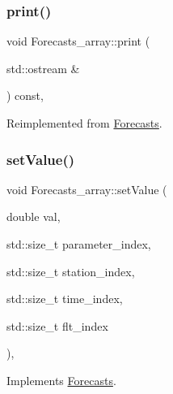 \mbox{\label{class_forecasts__array_a56985347f516340034b29dc4cdda87b1}} 
\subsubsection{\texorpdfstring{print()}{print()}}
{\footnotesize\ttfamily void Forecasts\+\_\+array\+::print (\begin{DoxyParamCaption}\item[{std\+::ostream \&}]{ }\end{DoxyParamCaption}) const\hspace{0.3cm}{\ttfamily [override]}, {\ttfamily [virtual]}}



Reimplemented from \mbox{\hyperlink{class_forecasts_addb1f75f0dc6833c466453c51256812c}{Forecasts}}.

\mbox{\label{class_forecasts__array_a19d59c93e8b7692ebae2d3e15dc43f87}} 
\subsubsection{\texorpdfstring{set\+Value()}{setValue()}\hspace{0.1cm}{\footnotesize\ttfamily [1/2]}}
{\footnotesize\ttfamily void Forecasts\+\_\+array\+::set\+Value (\begin{DoxyParamCaption}\item[{double}]{val,  }\item[{std\+::size\+\_\+t}]{parameter\+\_\+index,  }\item[{std\+::size\+\_\+t}]{station\+\_\+index,  }\item[{std\+::size\+\_\+t}]{time\+\_\+index,  }\item[{std\+::size\+\_\+t}]{flt\+\_\+index }\end{DoxyParamCaption})\hspace{0.3cm}{\ttfamily [override]}, {\ttfamily [virtual]}}



Implements \mbox{\hyperlink{class_forecasts_a4ce21957ef296384b1e251098db953bc}{Forecasts}}.

\mbox{\label{class_forecasts__array_a7224d8333630fcd162a1b69b49241d2f}} 
